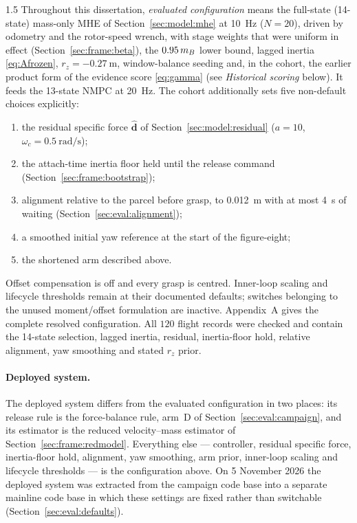 \begin{spacing}{1.5}
Throughout this dissertation, \emph{evaluated configuration} means the
full-state (14-state) mass-only MHE of Section~\ref{sec:model:mhe} at
\SI{10}{\hertz} ($N=20$), driven by odometry and the rotor-speed wrench, with
stage weights that were uniform in effect (Section~\ref{sec:frame:beta}), the
$0.95\,m_B$ lower bound,
lagged inertia \eqref{eq:Afrozen}, $r_z=\SI{-0.27}{\meter}$, window-balance
seeding and, in the cohort, the earlier product form of the evidence score
\eqref{eq:gamma} (see \emph{Historical scoring} below). It feeds the 13-state
NMPC at \SI{20}{\hertz}. The cohort additionally
sets five non-default choices explicitly:
\begin{enumerate}
\item the residual specific force $\hat{\bm d}$ of
Section~\ref{sec:model:residual} ($a=10$, $\omega_c=\SI{0.5}{\radian\per\second}$);
\item the attach-time inertia floor held until the release command
(Section~\ref{sec:frame:bootstrap});
\item alignment relative to the parcel before grasp, to \SI{0.012}{\meter}
with at most \SI{4}{\second} of waiting (Section~\ref{sec:eval:alignment});
\item a smoothed initial yaw reference at the start of the figure-eight;
\item the shortened arm described above.
\end{enumerate}
Offset compensation is off and every grasp is centred. Inner-loop scaling and
lifecycle thresholds remain at their documented defaults; switches belonging to
the unused moment/offset formulation are inactive. Appendix~A gives the complete
resolved configuration. All $120$ flight records were checked and contain the
14-state selection, lagged inertia, residual, inertia-floor hold, relative
alignment, yaw smoothing and stated $r_z$ prior.

\paragraph{Deployed system.} The deployed system differs from the evaluated
configuration in two places: its release rule is the force-balance rule, arm~D
of Section~\ref{sec:eval:campaign}, and its estimator is the reduced
velocity--mass estimator of Section~\ref{sec:frame:redmodel}. Everything else
--- controller, residual specific force, inertia-floor hold, alignment, yaw
smoothing, arm prior, inner-loop scaling and lifecycle thresholds --- is the
configuration above. On 5 November 2026 the deployed system was extracted from
the campaign code base into a separate mainline code base in which these
settings are fixed rather than switchable (Section~\ref{sec:eval:defaults}).


\end{spacing}
